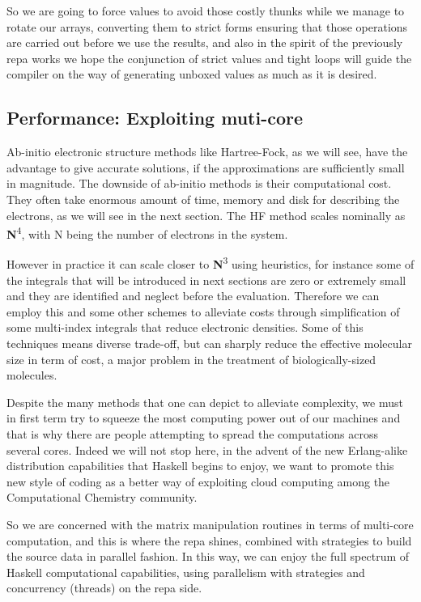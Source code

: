 \documentclass{tmr}
\begin{document}
So we are going to force values to avoid those costly thunks while we manage to rotate our arrays, 
converting them to strict forms ensuring that those operations are carried out before we use the results,
and also in the spirit of the previously repa works we hope the conjunction of strict values 
and tight loops will guide the compiler on the way of generating unboxed values as much as it is desired.

\subsection{Performance: Exploiting muti-core}

Ab-initio electronic structure methods like Hartree-Fock, as we will see,
 have the advantage to give accurate solutions, if the approximations 
are sufficiently small in magnitude. The downside of ab-initio methods
 is their computational cost. They often take enormous amount of time, 
memory and disk for describing the electrons, as we will see in the next section. The HF method scales nominally 
as {\textbf N\textsuperscript{4}}, with N being the number of electrons in the system. 


However in practice it can scale closer to {\textbf N\textsuperscript{3}} using heuristics,
for instance some of the integrals that will be introduced in next sections are zero or extremely
small and they are identified and neglect before the evaluation. Therefore we can employ this and some other
schemes to alleviate costs through simplification of some multi-index integrals that reduce electronic densities. 
Some of this techniques means diverse trade-off, but can sharply reduce the effective molecular size
in term of cost, a major problem in the treatment of biologically-sized molecules.

Despite the many methods that one can depict to alleviate complexity,
 we must in first term try to squeeze the most computing power out of our machines
and that is why there are people attempting to spread the computations across several cores.
 Indeed we will not stop here, in the advent of the new Erlang-alike 
distribution capabilities that Haskell begins to enjoy, we want to promote this new style of
 coding as a better way of exploiting cloud computing among the 
Computational Chemistry community.

So we are concerned with the matrix manipulation routines in terms of multi-core computation,
and this is where the repa shines, combined with strategies to build the source data in parallel fashion. In this way,
we can enjoy the full spectrum of Haskell computational capabilities, using parallelism with strategies and
concurrency (threads) on the repa side.
\end{document}
